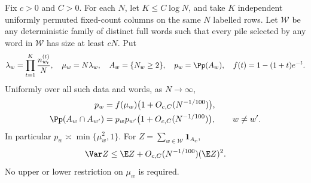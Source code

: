 \begin{lemma}
\label{lem:two-category-poisson}
Fix $c>0$ and $C>0$. For each $N$, let $K\le C\log N$, and take $K$
independent uniformly permuted fixed-count columns on the same $N$ labelled
rows. Let $\mathcal W$ be any deterministic family of distinct full words
such that every pile selected by any word in $\mathcal W$ has size at least
$cN$. Put
\[
 \lambda_w=\prod_{t=1}^{K}\frac{n_{w_t}^{(t)}}N,
 \quad \mu_w=N\lambda_w,
 \quad A_w=\{N_w\ge2\},\quad p_w=\Pp(A_w),
 \quad f(t)=1-(1+t)e^{-t}.
\]
Uniformly over all such data and words, as $N\to\infty$,
\begin{align}
 p_w&=f(\mu_w)\bigl(1+O_{c,C}(N^{-1/100})\bigr),
 \label{eq:uniform-collision-marginal}\\
 \Pp(A_w\cap A_{w'})
 &=p_wp_{w'}\bigl(1+O_{c,C}(N^{-1/100})\bigr),\qquad w\ne w'.
 \label{eq:uniform-collision-pair}
\end{align}
In particular $p_w\asymp\min\{\mu_w^2,1\}$. For
$Z=\sum_{w\in\mathcal W}\mathbf 1_{A_w}$,
\begin{equation}
\label{eq:uniform-collision-variance}
 \Var Z\le\E Z+O_{c,C}(N^{-1/100})(\E Z)^2.
\end{equation}
No upper or lower restriction on $\mu_w$ is required.
\end{lemma}

